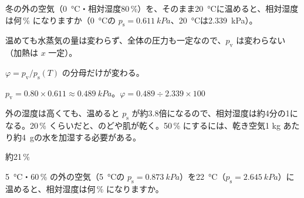\begin{reidai}[冬の部屋が乾燥するわけ]
\label{ph:熱-9:ex5}冬の外の空気（\qty{0}{\celsius}・相対湿度80\,\%）を、そのまま\qty{20}{\celsius}に温めると、相対湿度は何\,\% になりますか（\qty{0}{\celsius}の $p_{\mathrm s}=\qty{0.611}{kPa}$、\qty{20}{\celsius}は\qty{2.339}{kPa}）。
\par{} 温めても水蒸気の量は変わらず、全体の圧力も一定なので、$p_{\mathrm v}$ は変わらない（加熱は $x$ 一定）。
\par\kangaekata $\varphi=p_{\mathrm v}/p_{\mathrm s}(T)$ の分母だけが変わる。
\par\shiki $p_{\mathrm v}=0.80\times0.611\approx\qty{0.489}{kPa}$。$\varphi=0.489\div2.339\times100$
\par{} 外の湿度は高くても、温めると $p_{\mathrm s}$ が約3.8倍になるので、相対湿度は約4分の1になる。20\,\% くらいだと、のどや肌が乾く。50\,\% にするには、乾き空気1 kg あたり約\qty{4}{g}の水を加湿する必要がある。
\par\kotae 約21\,\%
\end{reidai}
\begin{jibun}
\qty{5}{\celsius}・60\,\% の外の空気（\qty{5}{\celsius}の $p_{\mathrm s}=\qty{0.873}{kPa}$）を\qty{22}{\celsius}（$p_{\mathrm s}=\qty{2.645}{kPa}$）に温めると、相対湿度は何\,\% になりますか。
\end{jibun}

